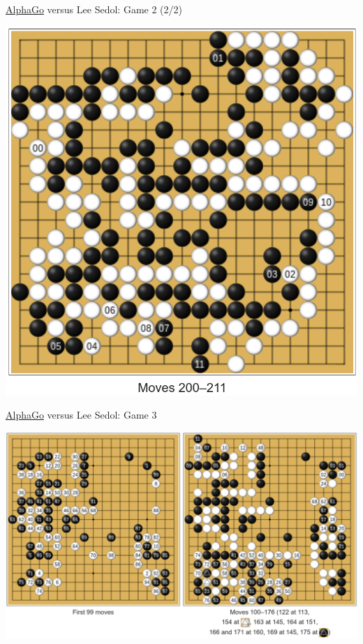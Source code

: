 \documentclass{beamer}
\begin{document}
{    \begin{frame}{{\color{black}\underline{AlphaGo}} versus {\color{white}Lee Sedol}: Game 2 (2/2)}
      \begin{center}
        \includegraphics[height=.85\textheight]{../img/AlphaGo_vs_Lee_Sedol_Game_2b.png}
      \end{center}
    \end{frame}

    \begin{frame}{{\color{white}\underline{AlphaGo}} versus {\color{black}Lee Sedol}: Game 3}
      \begin{center}
        \includegraphics[width=\textwidth]{../img/AlphaGo_vs_Lee_Sedol_Game_3.png}


\end{center}
\end{frame}}
\end{document}
